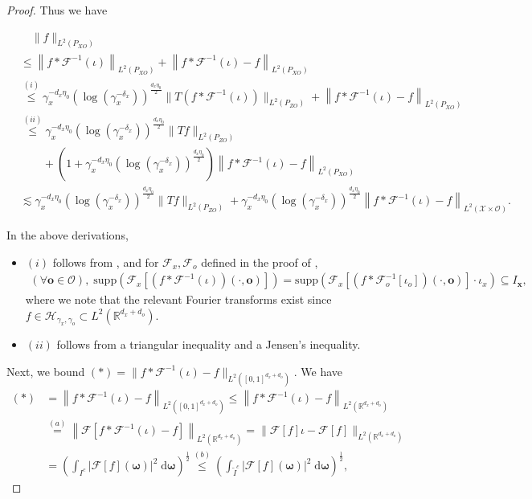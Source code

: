 \documentclass[11pt]{article}
\newcommand{\bx}{\mathbf x}
\newcommand{\bo}{\mathbf o}
\newcommand{\bomega}{\boldsymbol{\omega}}
\newcommand{\calF}{\mathcal{F}}
\newcommand{\calH}{\mathcal{H}}
\newcommand{\calO}{\mathcal{O}}
\newcommand{\calX}{\mathcal{X}}
\newcommand{\R}{\mathbb{R}}
\newcommand{\0}{\mathbf{0}}
\begin{document}
\begin{appendix}
\begin{proof}
Thus we have
\begin{small}
\begin{align}
    &\quad \|f\|_{L^2(P_{XO})} \nonumber \\
    &\leq \left\|f\ast \calF^{-1}(\iota)\right\|_{L^2(P_{XO})} + \left\|f\ast \calF^{-1}(\iota) - f\right\|_{L^2(P_{XO})} \nonumber \\
    &\stackrel{(i)}{\leq} \gamma_x^{-d_x\eta_0} (\log (\gamma_x^{-\delta_x}))^{\frac{d_x\eta_0}{2}} \|T(f\ast \calF^{-1}(\iota))\|_{L^2(P_{ZO})} + \left\|f\ast \calF^{-1}(\iota) - f\right\|_{L^2(P_{XO})} \nonumber\\
    &\stackrel{(ii)}{\leq} \gamma_x^{-d_x\eta_0} (\log (\gamma_x^{-\delta_x}))^{\frac{d_x\eta_0}{2}} \|Tf\|_{L^2(P_{ZO})} \nonumber \\
    &\qquad + \left(1 + \gamma_x^{-d_x\eta_0} (\log (\gamma_x^{-\delta_x}))^{\frac{d_x\eta_0}{2}} \right)\left\|f\ast \calF^{-1}(\iota) - f\right\|_{L^2(P_{XO})} 
    \nonumber \\
    &\lesssim \gamma_x^{-d_x\eta_0} (\log (\gamma_x^{-\delta_x}))^{\frac{d_x\eta_0}{2}} \|Tf\|_{L^2(P_{ZO})}  + \gamma_x^{-d_x\eta_0} (\log (\gamma_x^{-\delta_x}))^{\frac{d_x\eta_0}{2}} \left\|f\ast \calF^{-1}(\iota) - f\right\|_{L^2(\calX\times\calO)} 
    \label{eq:intermediate_reverse_link}.
\end{align}
\end{small}
In the above derivations,
\begin{itemize}
    \item $(i)$ follows from , and for $\calF_x,\calF_o$ defined in the proof of ,
\begin{align*}
    (\forall \bo\in \calO),\; \mathrm{supp}(\calF_x[(f\ast \calF^{-1}(\iota))(\cdot,\bo)]) = \mathrm{supp}(\calF_x[(f\ast \calF_o^{-1}[\iota_o])(\cdot, \bo)] \cdot  \iota_x) \subseteq I_{\bx},
\end{align*}
where we note that the relevant Fourier transforms exist since $f\in \calH_{\gamma_x,\gamma_o}\subset L^2(\mathbb{R}^{d_x+d_o})$. 
    \item $(ii)$ follows from a triangular inequality and a Jensen's inequality. 
\end{itemize}
Next, we bound $(\ast) =\|f\ast \calF^{-1}(\iota) - f\|_{L^2([0,1]^{d_x+d_o})}$. We have
\begin{align*}
    (\ast) &= \left\|f\ast \calF^{-1}(\iota) - f\right\|_{L^2([0,1]^{d_x+d_o})} \leq \left\|f\ast \calF^{-1}(\iota) - f\right\|_{L^2(\R^{d_x+d_o})}\\ &\stackrel{(a)}{=} \left\|\calF\left[f\ast \calF^{-1}(\iota) - f\right]\right\|_{L^2(\R^{d_x+d_o})}= \|\calF[f]\iota - \calF[f]\|_{L^2(\R^{d_x+d_o})}\\ &= \left(\int_{I^{c}} |\calF[f](\bomega)|^2\;\mathrm{d}\bomega\right)^{\frac{1}{2}} \stackrel{(b)}{\leq} \left(\int_{\tilde{I}^{c}} |\calF[f](\bomega)|^2\;\mathrm{d}\bomega\right)^{\frac{1}{2}} ,

\end{align*}
\end{proof}
\end{appendix}
\end{document}
